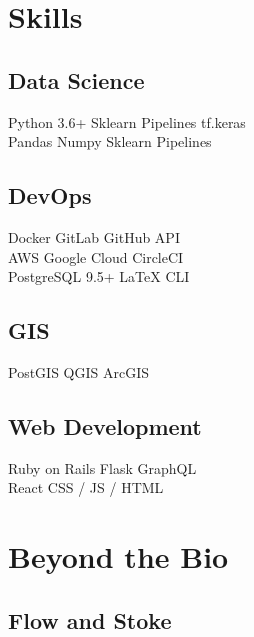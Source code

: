 \documentclass[letterpaper]{deedy-resume} %
\begin{document}
\begin{minipage}[t]{0.33\textwidth}
\sectionspace %



\section{Skills}

\subsection{Data Science}

Python 3.6+ \textbullet{} Sklearn Pipelines \textbullet{} tf.keras\\
Pandas \textbullet{} Numpy \textbullet{} Sklearn Pipelines \\

\subsection{DevOps}
Docker \textbullet{} GitLab \textbullet{} GitHub \textbullet{} API \\ 
AWS \textbullet{} Google Cloud \textbullet{} CircleCI  \\
PostgreSQL 9.5+ \textbullet{} \LaTeX \textbullet{} CLI\\

\subsection{GIS}
PostGIS \textbullet{} QGIS \textbullet{} ArcGIS 

\subsection{Web Development}
Ruby on Rails \textbullet{} Flask \textbullet{} GraphQL \\
React \textbullet{} CSS / JS / HTML

\sectionspace %


\section{Beyond the Bio}

\subsection{Flow and Stoke}


\end{minipage}
\end{document}
